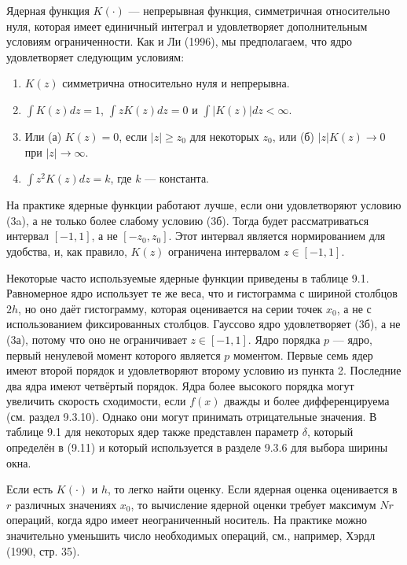 Ядерная функция $K(\cdot)$ --- непрерывная функция, симметричная относительно нуля, которая имеет единичный интеграл и удовлетворяет дополнительным условиям ограниченности. Как и Ли (1996), мы предполагаем, что ядро удовлетворяет следующим условиям:
\begin{enumerate}
\item $K(z)$ симметрична относительно нуля и непрерывна.
\item $\int K(z)dz = 1$, $\int zK(z)dz = 0$ и $\int |K(z)|dz < \infty$.
\item Или (а) $K(z) = 0$, если $|z| \geq z_0$ для некоторых $z_0$, или (б) $|z|K(z) \rightarrow 0$ при $|z| \rightarrow \infty$.
\item $\int z^2K(z)dz = k$, где $k$ --- константа.
\end{enumerate}

На практике ядерные функции работают лучше, если они удовлетворяют условию (3a), а не только более слабому условию (3б). Тогда будет рассматриваться интервал $[-1,1]$, а не $[- z_0, z_0]$. Этот интервал является нормированием для удобства, и, как правило, $K(z)$ ограничена интервалом $z \in [-1,1]$.

Некоторые часто используемые ядерные функции приведены в таблице 9.1. Равномерное ядро использует те же веса, что и гистограмма с шириной столбцов $2h$, но оно даёт гистограмму, которая оценивается на серии точек $x_0$, а не с использованием фиксированных столбцов. Гауссово ядро удовлетворяет (3б), а не (3а), потому что оно не ограничивает $z \in [-1,1]$. Ядро порядка $p$ --- ядро, первый ненулевой момент которого является $p$ моментом. Первые семь ядер имеют второй порядок и удовлетворяют второму условию из пункта 2. Последние два ядра имеют четвёртый порядок. Ядра более высокого порядка могут увеличить скорость сходимости, если $f(x)$ дважды и более дифференцируема (см. раздел 9.3.10). Однако они могут принимать отрицательные значения. В таблице 9.1 для некоторых ядер также представлен параметр $\delta$, который определён в (9.11) и который используется в разделе 9.3.6 для выбора ширины окна.

Если есть $K(\cdot)$ и $h$, то легко найти оценку. Если ядерная оценка оценивается в $r$ различных значениях $x_0$, то вычисление ядерной оценки требует максимум $Nr$ операций, когда ядро имеет неограниченный носитель. На практике можно значительно уменьшить число необходимых операций, см., например, Хэрдл (1990, стр. 35).


